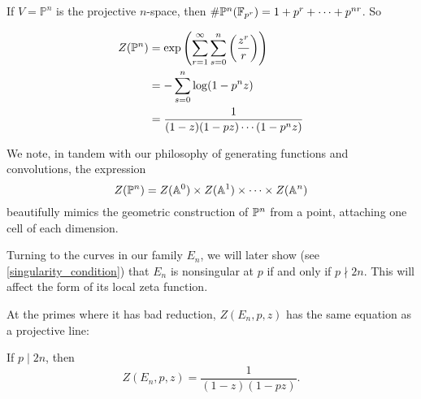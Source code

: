 \documentclass[12pt, a4paper]{amsart}
\begin{document}
\begin{example}
  If $V = \mathbb{P}^n$ is the projective $n$-space,
  then $\# {\mathbb P}^n(\mathbb{F}_{p^r})  
  = 1 + p^r + \cdots + p^{nr}$. So

  \begin{equation*}
    \begin{split}
      Z(\mathbb{{\mathbb P}}^n) &= \exp \left(  \sum\limits_{r=1}^\infty
        \sum\limits_{s=0}^{n} \left(  \frac{z^r}{r}  \right) \right) \\
      &= - \sum\limits_{s=0}^{n} \log (1 - p^n z) \\
      &= \frac{1}{(1-z) (1-pz) \cdots (1-p^{n} z)}
    \end{split}
  \end{equation*}
\end{example}

We note, in tandem with our philosophy of generating functions and convolutions,
the expression
\[Z({\mathbb P}^n) = Z(\mathbb{A}^0) \times Z(\mathbb{A}^1) \times \cdots \times Z(\mathbb{A}^n)\]
beautifully mimics the geometric construction of ${\mathbb P}^n$ from a point, attaching
one cell of each dimension. 

Turning to the curves in our family $E_n$, we will later show
(see \autoref{singularity_condition})
that $E_n$ is nonsingular at $p$ if and only if $p \nmid 2n$. This will affect
the form of its local zeta function.

At the primes where it has bad reduction, $Z(E_n,p,z)$ has the same equation as
a projective line:

\begin{prop}
  If $p \mid 2n$, then
  \[Z(E_n, p, z) = \frac{1}{(1-z)(1-pz)}.\]
\end{prop}
\end{document}
